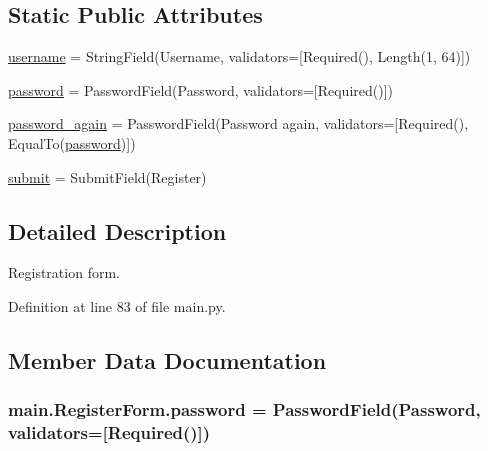 \subsection*{Static Public Attributes}
\begin{DoxyCompactItemize}
\item 
\hyperlink{classmain_1_1RegisterForm_a358e684fade440a73243b01b69778fe9}{username} = String\+Field(\textquotesingle{}Username\textquotesingle{}, validators=\mbox{[}Required(), Length(1, 64)\mbox{]})
\item 
\hyperlink{classmain_1_1RegisterForm_a995a1a67b85b4165619b8cb0863940f0}{password} = Password\+Field(\textquotesingle{}Password\textquotesingle{}, validators=\mbox{[}Required()\mbox{]})
\item 
\hyperlink{classmain_1_1RegisterForm_a045a58303acc98394aedb828655268ab}{password\+\_\+again} = Password\+Field(\textquotesingle{}Password again\textquotesingle{}, validators=\mbox{[}Required(), Equal\+To(\textquotesingle{}\hyperlink{classmain_1_1RegisterForm_a995a1a67b85b4165619b8cb0863940f0}{password}\textquotesingle{})\mbox{]})
\item 
\hyperlink{classmain_1_1RegisterForm_a1d788d2aac9c4ac25887eb8b2072d170}{submit} = Submit\+Field(\textquotesingle{}Register\textquotesingle{})
\end{DoxyCompactItemize}


\subsection{Detailed Description}
\begin{DoxyVerb}Registration form.\end{DoxyVerb}
 

Definition at line 83 of file main.\+py.



\subsection{Member Data Documentation}
\subsubsection[{\texorpdfstring{password}{password}}]{\setlength{\rightskip}{0pt plus 5cm}main.\+Register\+Form.\+password = Password\+Field(\textquotesingle{}Password\textquotesingle{}, validators=\mbox{[}Required()\mbox{]})\hspace{0.3cm}{\ttfamily [static]}}\hypertarget{classmain_1_1RegisterForm_a995a1a67b85b4165619b8cb0863940f0}{}\label{classmain_1_1RegisterForm_a995a1a67b85b4165619b8cb0863940f0}


